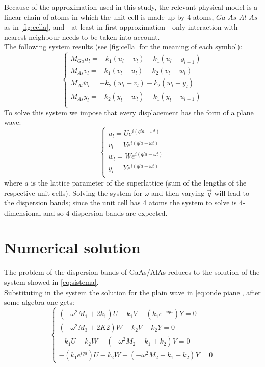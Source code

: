 \documentclass{article}
\begin{document}
Because of the approximation used in this study, the relevant physical model is a linear chain of atoms in which the unit cell is made up by 4 atoms, $Ga$-$As$-$Al$-$As$ as in \autoref{fig:cella}, and - at least in first approximation - only interaction with nearest neighbour needs to be taken into account. \\
The following system results (see \autoref{fig:cella} for the meaning of each symbol):
\begin{equation}
	\begin{cases}
	M_{Ga}\ddot{u_l} = -k_1(u_l-v_l) - k_1(u_l-y_{l-1}) \\
	M_{As}\ddot{v_l} = -k_1(v_l-u_l) - k_2(v_l-w_l) \\
	M_{Al}\ddot{w_l} = -k_2(w_l-v_l) - k_2(w_l-y_l) \\
	M_{As}\ddot{y_l} = -k_2(y_l-w_l) - k_1(y_l-u_{l+1}) \\
	\end{cases}
	\label{eq:sistema}	
\end{equation}
To solve this system we impose that every displacement has the form of a plane wave:
\begin{equation}
	\begin{cases}
	u_l = Ue^{i(qla-\omega t)} \\
	v_l = Ve^{i(qla-\omega t)} \\
	w_l = We^{i(qla-\omega t)} \\
	y_l = Ye^{i(qla-\omega t)} \\
	\end{cases}
	\label{eq:onde piane}
\end{equation}
where $a$ is the lattice parameter of the superlattice (sum of the lengths of the respective unit cells).
Solving the system for $\omega$ and then varying $\vec{q}$ will lead to the dispersion bands; since the unit cell has 4 atoms the system to solve is 4-dimensional and so 4 dispersion bands are expected.  

\section{Numerical solution}
The problem of the dispersion bands of GaAs/AlAs reduces to the solution of the system showed in \autoref{eq:sistema}. \\
Substituting in the system the solution for the plain wave in \autoref{eq:onde piane}, after some algebra one gets:
\begin{equation}
	\begin{cases}
	(-\omega^2M_1 + 2k_1)U - k_1V - (k_1e^{-iqa})Y = 0 \\
    (-\omega^2M_3 + 2K2)W -k_2V - k_2Y = 0 \\
	-k_1U -k_2W + (-\omega^2M_2 + k_1 + k_2)V = 0 \\
	-(k_1e^{iqa})U - k_2W + (-\omega^2M_2 + k_1 + k_2)Y = 0	
	\end{cases}
	\label{sist.final}
\end {equation}
\end{document}
